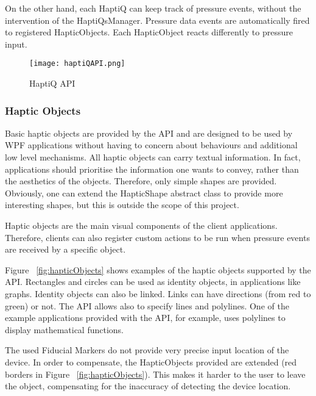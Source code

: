 On the other hand, each HaptiQ can keep track of pressure events, without the intervention of the HaptiQsManager. Pressure data events are automatically fired to registered HapticObjects. Each HapticObject reacts differently to pressure input. 

\begin{figure}[H]
  \centering
  \texttt{[image: haptiQAPI.png]}
  \caption{HaptiQ API}
  \label{fig:haptiQ_api}
\end{figure}

\subsubsection{Haptic Objects}
Basic haptic objects are provided by the API and are designed to be used by WPF applications without having to concern about behaviours and additional low level mechanisms. All haptic objects can carry textual information. In fact, applications should prioritise the information one wants to convey, rather than the aesthetics of the objects. Therefore, only simple shapes are provided. Obviously, one can extend the HapticShape abstract class to provide more interesting shapes, but this is outside the scope of this project.

Haptic objects are the main visual components of the client applications. Therefore, clients can also register custom actions to be run when pressure events are received by a specific object.

Figure ~\ref{fig:hapticObjects} shows examples of the haptic objects supported by the API. Rectangles and circles can be used as identity objects, in applications like graphs. Identity objects can also be linked. Links can have directions (from red to green) or not. The API allows also to specify lines and polylines. One of the example applications provided with the API, for example, uses polylines to display mathematical functions.

The used Fiducial Markers do not provide very precise input location of the device. In order to compensate, the HapticObjects provided are extended (red borders in Figure ~\ref{fig:hapticObjects}). This makes it harder to the user to leave the object, compensating for the inaccuracy of detecting the device location.

